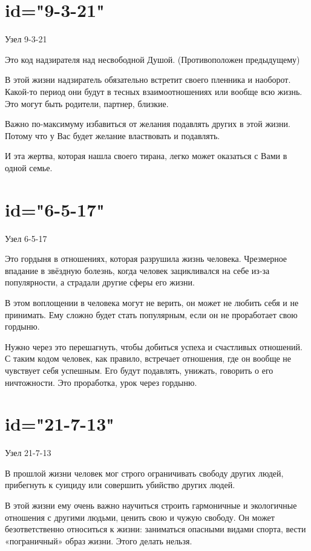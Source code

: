 \section{id="9-3-21"}{Узел 9-3-21}
\item Это код надзирателя над несвободной Душой. (Противоположен предыдущему)
\item В этой жизни надзиратель обязательно встретит своего пленника и наоборот. Какой-то период они будут в тесных взаимоотношениях или вообще всю жизнь. Это могут быть родители, партнер, близкие.
\item Важно по-максимуму избавиться от желания подавлять других в этой жизни. Потому что у Вас будет желание властвовать и подавлять.
\item И эта жертва, которая нашла своего тирана, легко может оказаться с Вами в одной семье.
\endsection

\section{id="6-5-17"}{Узел 6-5-17}
\item Это гордыня в отношениях, которая разрушила жизнь человека. Чрезмерное впадание в звёздную болезнь, когда человек зацикливался на себе из-за популярности, а страдали другие сферы его жизни.
\item В этом воплощении в человека могут не верить, он может не любить себя и не принимать. Ему сложно будет стать популярным, если он не проработает свою гордыню.
\item Нужно через это перешагнуть, чтобы добиться успеха и счастливых отношений. С таким кодом человек, как правило, встречает отношения, где он вообще не чувствует себя успешным. Его будут подавлять, унижать, говорить о его ничтожности. Это проработка, урок через гордыню.
\endsection

\section{id="21-7-13"}{Узел 21-7-13}
\item В прошлой жизни человек мог строго ограничивать свободу других людей, прибегнуть к суициду или совершить убийство других людей.
\item В этой жизни ему очень важно научиться строить гармоничные и экологичные отношения с другими людьми, ценить свою и чужую свободу. Он может безответственно относиться к жизни: заниматься опасными видами спорта, вести «пограничный» образ жизни. Этого делать нельзя.
\endsection

